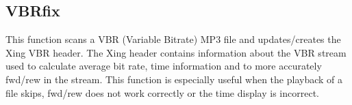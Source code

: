 \subsection{VBRfix}
This function scans a VBR (Variable Bitrate)
MP3 file and updates/creates the Xing VBR header. The Xing header
contains information about the VBR stream used to calculate average bit
rate, time information and to more accurately fwd/rew in the stream.
This function is especially useful when the playback of a file skips,
fwd/rew does not work correctly or the time display is incorrect. 



